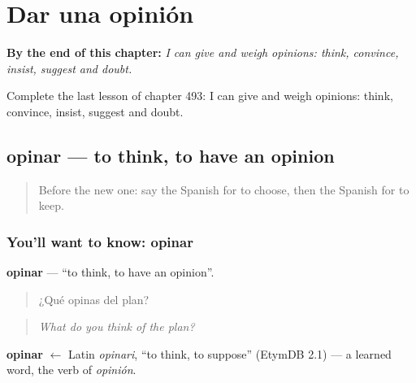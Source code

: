 
\chapter{Dar una opinión}
\label{ch:es-dar-una-opinion}

\begin{chapteropening}
\textbf{By the end of this chapter:} \emph{I can give and weigh opinions: think, convince, insist, suggest and doubt.}

Complete the last lesson of chapter 493: I can give and weigh opinions: think, convince, insist, suggest and doubt.
\end{chapteropening}

\section[opinar]{opinar — to think, to have an opinion}

\label{lesson:ES-C493-opinar}



\begin{quote}
Before the new one: say the Spanish for to choose, then the Spanish for to keep.
\end{quote}

\subsection*{You'll want to know: opinar}
\textbf{opinar} — \textquotedblleft{}to think, to have an opinion\textquotedblright{}.

\begin{quote}
¿Qué opinas del plan?
\end{quote}

\begin{quote}
\emph{What do you think of the plan?}
\end{quote}

\begin{cousinweb}
\textbf{opinar} $\leftarrow$ Latin \emph{opinari}, \textquotedblleft{}to think, to suppose\textquotedblright{} (EtymDB 2.1) — a learned word, the verb of \emph{opinión}.
\end{cousinweb}

